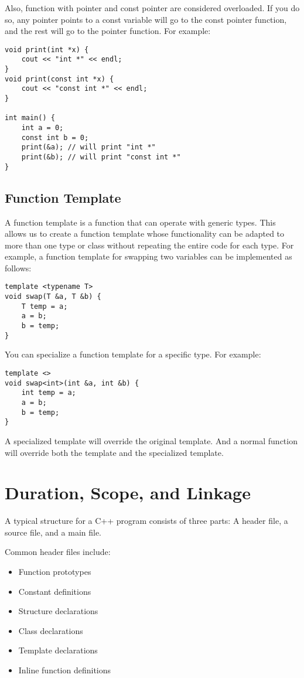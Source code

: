 \documentclass[a4paper,12pt]{article}
\begin{document}
Also, function with pointer and const pointer are considered overloaded.
If you do so, any pointer points to a const variable will go to the const pointer function, and the rest will go to the pointer function.
For example:
\begin{verbatim}
void print(int *x) {
    cout << "int *" << endl;
}
void print(const int *x) {
    cout << "const int *" << endl;
}

int main() {
    int a = 0;
    const int b = 0;
    print(&a); // will print "int *"
    print(&b); // will print "const int *"
}
\end{verbatim}

\subsection{Function Template}

A function template is a function that can operate with generic types.
This allows us to create a function template whose functionality can be adapted to more than one type or class without repeating the entire code for each type.
For example, a function template for swapping two variables can be implemented as follows:
\begin{verbatim}
template <typename T>
void swap(T &a, T &b) {
    T temp = a;
    a = b;
    b = temp;
}
\end{verbatim}

You can specialize a function template for a specific type.
For example:
\begin{verbatim}
template <>
void swap<int>(int &a, int &b) {
    int temp = a;
    a = b;
    b = temp;
}
\end{verbatim}

A specialized template will override the original template.
And a normal function will override both the template and the specialized template.

\section{Duration, Scope, and Linkage}

A typical structure for a C++ program consists of three parts: A header file, a source file, and a main file.

Common header files include:
\begin{itemize}
	\item Function prototypes
	\item Constant definitions
	\item Structure declarations
	\item Class declarations
	\item Template declarations
	\item Inline function definitions
\end{itemize}
\end{document}
